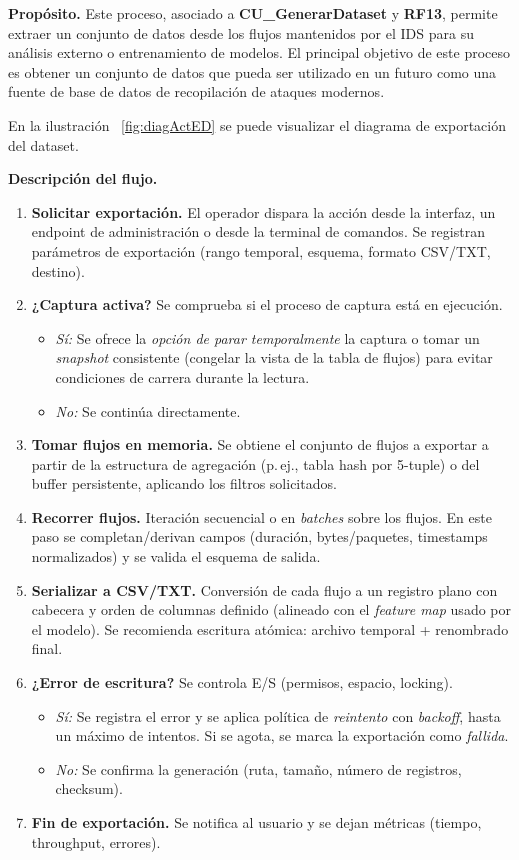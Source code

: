 \textbf{Propósito.} Este proceso, asociado a \textbf{CU\_GenerarDataset} y \textbf{RF13}, permite extraer un conjunto de datos desde los flujos mantenidos por el IDS para su análisis externo o entrenamiento de modelos. El principal objetivo de este proceso es obtener un conjunto de datos que pueda ser utilizado en un futuro como una fuente de base de datos de recopilación de ataques modernos.

En la ilustración ~\ref{fig:diagActED} se puede visualizar el diagrama de exportación del dataset.

\textbf{Descripción del flujo.}
\begin{enumerate}
  \item \textbf{Solicitar exportación.} El operador dispara la acción desde la interfaz, un endpoint de administración o desde la terminal de comandos. Se registran parámetros de exportación (rango temporal, esquema, formato CSV/TXT, destino).
  \item \textbf{¿Captura activa?} Se comprueba si el proceso de captura está en ejecución.
  \begin{itemize}
    \item \emph{Sí:} Se ofrece la \emph{opción de parar temporalmente} la captura o tomar un \emph{snapshot} consistente (congelar la vista de la tabla de flujos) para evitar condiciones de carrera durante la lectura.
    \item \emph{No:} Se continúa directamente.
  \end{itemize}
  \item \textbf{Tomar flujos en memoria.} Se obtiene el conjunto de flujos a exportar a partir de la estructura de agregación (p.\,ej., tabla hash por 5-tuple) o del buffer persistente, aplicando los filtros solicitados.
  \item \textbf{Recorrer flujos.} Iteración secuencial o en \emph{batches} sobre los flujos. En este paso se completan/derivan campos (duración, bytes/paquetes, timestamps normalizados) y se valida el esquema de salida.
  \item \textbf{Serializar a CSV/TXT.} Conversión de cada flujo a un registro plano con cabecera y orden de columnas definido (alineado con el \emph{feature map} usado por el modelo). Se recomienda escritura atómica: archivo temporal + renombrado final.
  \item \textbf{¿Error de escritura?} Se controla E/S (permisos, espacio, locking).
  \begin{itemize}
    \item \emph{Sí:} Se registra el error y se aplica política de \emph{reintento} con \emph{backoff}, hasta un máximo de intentos. Si se agota, se marca la exportación como \emph{fallida}.
    \item \emph{No:} Se confirma la generación (ruta, tamaño, número de registros, checksum).
  \end{itemize}
  \item \textbf{Fin de exportación.} Se notifica al usuario y se dejan métricas (tiempo, throughput, errores).
\end{enumerate}

